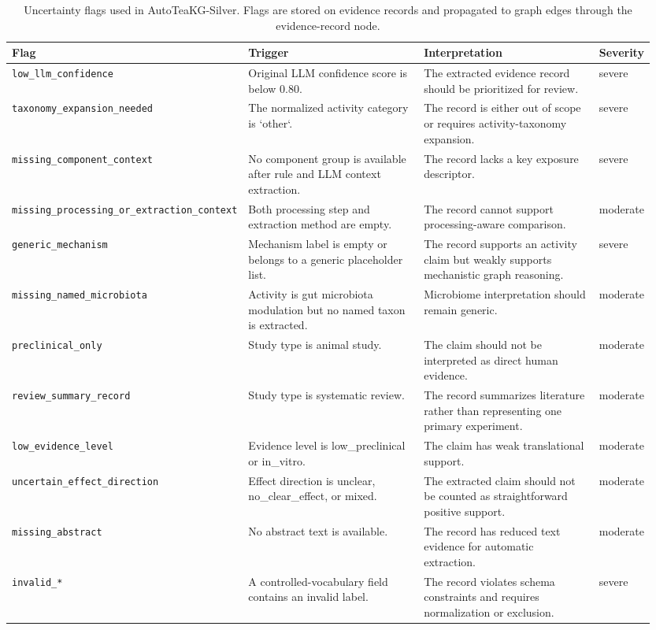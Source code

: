 \begin{table}[t]
\centering
\small
\caption{Uncertainty flags used in AutoTeaKG-Silver. Flags are stored on evidence records and propagated to graph edges through the evidence-record node.}
\label{tab:uncertainty_flags}
\begin{tabular}{p{0.23\linewidth}p{0.32\linewidth}p{0.32\linewidth}p{0.08\linewidth}}
\toprule
Flag & Trigger & Interpretation & Severity \\
\midrule
\texttt{low\_llm\_confidence} & Original LLM confidence score is below 0.80. & The extracted evidence record should be prioritized for review. & severe \\
\texttt{taxonomy\_expansion\_needed} & The normalized activity category is `other`. & The record is either out of scope or requires activity-taxonomy expansion. & severe \\
\texttt{missing\_component\_context} & No component group is available after rule and LLM context extraction. & The record lacks a key exposure descriptor. & severe \\
\texttt{missing\_processing\_or\_extraction\_context} & Both processing step and extraction method are empty. & The record cannot support processing-aware comparison. & moderate \\
\texttt{generic\_mechanism} & Mechanism label is empty or belongs to a generic placeholder list. & The record supports an activity claim but weakly supports mechanistic graph reasoning. & severe \\
\texttt{missing\_named\_microbiota} & Activity is gut microbiota modulation but no named taxon is extracted. & Microbiome interpretation should remain generic. & moderate \\
\texttt{preclinical\_only} & Study type is animal study. & The claim should not be interpreted as direct human evidence. & moderate \\
\texttt{review\_summary\_record} & Study type is systematic review. & The record summarizes literature rather than representing one primary experiment. & moderate \\
\texttt{low\_evidence\_level} & Evidence level is low_preclinical or in_vitro. & The claim has weak translational support. & moderate \\
\texttt{uncertain\_effect\_direction} & Effect direction is unclear, no_clear_effect, or mixed. & The extracted claim should not be counted as straightforward positive support. & moderate \\
\texttt{missing\_abstract} & No abstract text is available. & The record has reduced text evidence for automatic extraction. & moderate \\
\texttt{invalid\_*} & A controlled-vocabulary field contains an invalid label. & The record violates schema constraints and requires normalization or exclusion. & severe \\
\bottomrule
\end{tabular}
\end{table}
